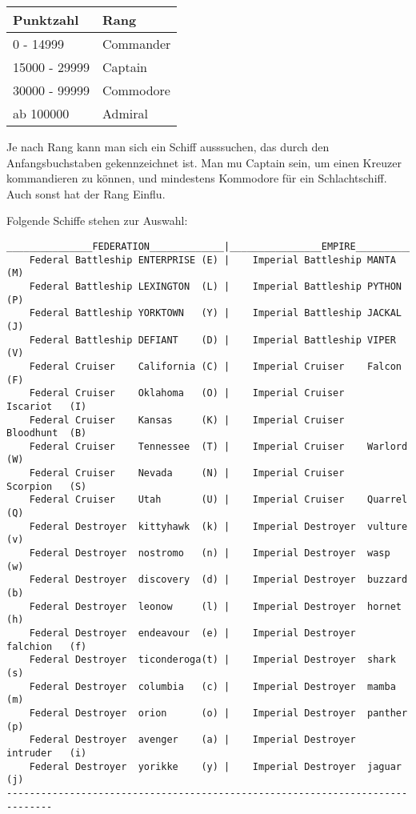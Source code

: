\begin{center}
\begin{tabular}{|l|l|}
\hline
Punktzahl & Rang \\ \hline \hline
0 - 14999 & Commander \\ \hline
15000 - 29999 & Captain \\ \hline
30000 - 99999 & Commodore \\ \hline
ab 100000     & Admiral \\ \hline
\end{tabular}
\end{center}

Je nach Rang kann man
sich ein Schiff ausssuchen, das durch den 
Anfangsbuchstaben gekennzeichnet ist. Man mu\3 Captain sein, um einen Kreuzer
kommandieren zu k\"onnen, und mindestens Kommodore f\"ur ein Schlachtschiff.
Auch sonst hat der Rang Einflu\3.

Folgende Schiffe stehen zur Auswahl:


\footnotesize
\hspace{-1.0cm}
\begin{verbatim}
_______________FEDERATION_____________|________________EMPIRE_________________
    Federal Battleship ENTERPRISE (E) |    Imperial Battleship MANTA      (M)
    Federal Battleship LEXINGTON  (L) |    Imperial Battleship PYTHON     (P)
    Federal Battleship YORKTOWN   (Y) |    Imperial Battleship JACKAL     (J)
    Federal Battleship DEFIANT    (D) |    Imperial Battleship VIPER      (V)
    Federal Cruiser    California (C) |    Imperial Cruiser    Falcon     (F)
    Federal Cruiser    Oklahoma   (O) |    Imperial Cruiser    Iscariot   (I)
    Federal Cruiser    Kansas     (K) |    Imperial Cruiser    Bloodhunt  (B)
    Federal Cruiser    Tennessee  (T) |    Imperial Cruiser    Warlord    (W)
    Federal Cruiser    Nevada     (N) |    Imperial Cruiser    Scorpion   (S)
    Federal Cruiser    Utah       (U) |    Imperial Cruiser    Quarrel    (Q)
    Federal Destroyer  kittyhawk  (k) |    Imperial Destroyer  vulture    (v)
    Federal Destroyer  nostromo   (n) |    Imperial Destroyer  wasp       (w)
    Federal Destroyer  discovery  (d) |    Imperial Destroyer  buzzard    (b)
    Federal Destroyer  leonow     (l) |    Imperial Destroyer  hornet     (h)
    Federal Destroyer  endeavour  (e) |    Imperial Destroyer  falchion   (f)
    Federal Destroyer  ticonderoga(t) |    Imperial Destroyer  shark      (s)
    Federal Destroyer  columbia   (c) |    Imperial Destroyer  mamba      (m)
    Federal Destroyer  orion      (o) |    Imperial Destroyer  panther    (p)
    Federal Destroyer  avenger    (a) |    Imperial Destroyer  intruder   (i)
    Federal Destroyer  yorikke    (y) |    Imperial Destroyer  jaguar     (j)
------------------------------------------------------------------------------
\end{verbatim}

